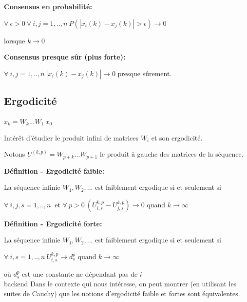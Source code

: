 \documentclass{beamer}
\begin{document}
\begin{frame}
	\textbf{Consensus en probabilité:}
	
	$\forall\ \epsilon > 0\ \forall\ i,j = 1,..,n\ P(|x_i(k) - x_j(k)| > \epsilon) \rightarrow 0$
	
	lorsque $k \rightarrow 0$
	
	\bigbreak
	
	\pause
	
	
	\textbf{Consensus presque sûr (plus forte):}
	
	$\forall\ i,j = 1,..,n\ |x_i(k) - x_j(k)|\rightarrow 0$ presque sûrement.
\end{frame}

\subsection{Ergodicité}
\begin{frame}
	$x_k = W_k ... W_1\ x_0$
	
	\bigbreak
	
	Intérêt d'étudier le produit infini de matrices $W_i$ et son ergodicité.
	
	\bigbreak
		
	Notons $U^{(k, p)} = W_{p+k}...W_{p+1}$ le produit à gauche des matrices de la séquence.
\end{frame}

\begin{frame}
	\textbf{Définition - Ergodicité faible:}
	
	La séquence infinie $W_1, W_2, ...$ est faiblement ergodique si et seulement si
	
	$ \forall\ i, j, s = 1,..,n\ $ et $\forall\ p > 0\ (U_{i,s}^{k,p} - U_{j,s}^{k,p}) \rightarrow 0$ quand $k \rightarrow \infty$
	
	\bigbreak

	\pause
	
	\textbf{Définition - Ergodicité forte:}
	
	La séquence infinie $W_1, W_2, ...$ est faiblement ergodique si et seulement si
	
	$ \forall\ i, s = 1,..,n\ U_{i,s}^{k,p} \rightarrow d_s^p$ quand $k \rightarrow \infty$
	
	où $d_s^p$ est une constante ne dépendant pas de $i$
	\\ backend
	\vspace{1cm}
	\pause
	Dans le contexte qui nous intéresse, on peut montrer (en utilisant les suites de Cauchy) 
	que les notions d'ergodicité faible et fortes sont équivalentes.
	
\end{frame}
\end{document}
